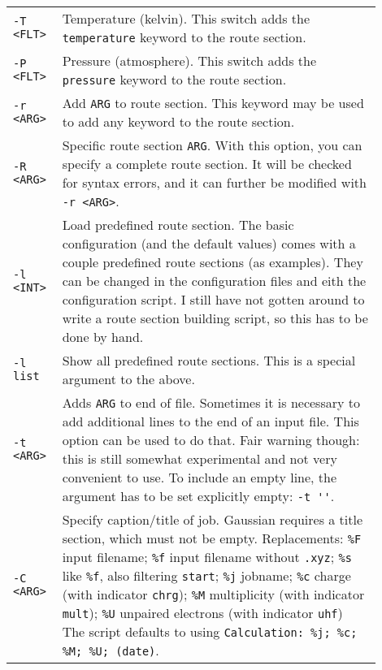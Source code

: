 \documentclass[   %
  final,          %
  a4paper         %
]{article}
\begin{document}
\begin{longtable}{p{0.1\linewidth}p{0.8\linewidth}}
  {\lstinline`-T <FLT>`} & Temperature (kelvin). This switch adds the \texttt{temperature} keyword to the route section. \\
  {\lstinline`-P <FLT>`} & Pressure (atmosphere). This switch adds the \texttt{pressure} keyword to the route section. \\
  {\lstinline`-r <ARG>`} & Add {\lstinline`ARG`} to route section. This keyword may be used to add any keyword to the route section. \\
  {\lstinline`-R <ARG>`} & Specific route section {\lstinline`ARG`}. 
    With this option, you can specify a complete route section. 
    It will be checked for syntax errors, and it can further be modified with {\lstinline`-r <ARG>`}. \\
  {\lstinline`-l <INT>`} & Load predefined route section. 
    The basic configuration (and the default values) comes with a couple predefined route sections (as examples).
    They can be changed in the configuration files and eith the configuration script. 
    I still have not gotten around to write a route section building script, so this has to be done by hand. \\
  {\lstinline`-l list `} & Show all predefined route sections. This is a special argument to the above. \\
  {\lstinline`-t <ARG>`} & Adds {\lstinline`ARG`} to end of file. 
    Sometimes it is necessary to add additional lines to the end of an input file.
    This option can be used to do that. Fair warning though: this is still somewhat experimental
    and not very convenient to use.
    To include an empty line, the argument has to be set explicitly empty: {\lstinline`-t ''`}.\\
  {\lstinline`-C <ARG>`} & Specify caption/title of job. 
    Gaussian requires a title section, which must not be empty. \newline%
    Replacements: 
    {\lstinline`%F`} input filename; %
    {\lstinline`%f`} input filename without \texttt{.xyz}; %
    {\lstinline`%s`} like {\lstinline`%f`}, also filtering \texttt{start}; %
    {\lstinline`%j`} jobname; %
    {\lstinline`%c`} charge (with indicator \texttt{chrg}); %
    {\lstinline`%M`} multiplicity (with indicator \texttt{mult}); %
    {\lstinline`%U`} unpaired electrons (with indicator \texttt{uhf}) \newline
    The script defaults to using {\lstinline`Calculation: %j; %c; %M; %U; (date)`}. \\

\end{longtable}
\end{document}
